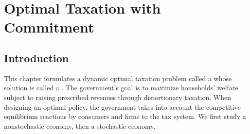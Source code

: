 

%


\showchaptIDtrue
\def\@chaptID{12.}



\def\toone{{t+1}}
\def\ttwo{{t+2}}
\def\tthree{{t+3}}
\def\Tone{{T+1}}
\def\TTT{{T-1}}
\def\rtr{{\rm tr}}
\chapter{Optimal Taxation with Commitment\label{optax}}

\section{Introduction}

This chapter formulates a dynamic optimal taxation problem called a
 whose solution is called a .
The government's goal is to maximize households' welfare subject to
raising prescribed revenues through distortionary taxation.  When designing
an optimal policy, the government takes into
account the competitive equilibrium reactions by consumers and firms to the
tax system. We first study a nonstochastic economy, then
a stochastic economy.

